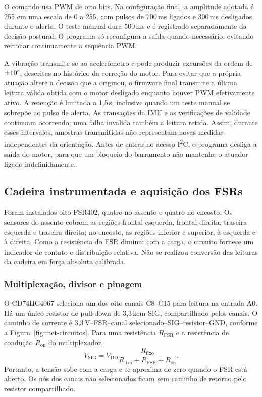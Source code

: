 O comando usa PWM de oito bits. Na configuração final, a amplitude
adotada é 255 em uma escala de 0 a 255, com pulsos de 700\,ms ligados
e 300\,ms desligados durante o alerta. O teste manual dura
500\,ms e é registrado separadamente da decisão postural. O programa
só reconfigura a saída quando necessário, evitando reiniciar
continuamente a sequência PWM.

A vibração transmite-se ao acelerômetro e pode produzir excursões da
ordem de $\pm10\degree{}$, descritas no histórico da correção do motor.
Para evitar que a própria atuação altere a decisão que a originou, o
firmware final transmite a última leitura válida obtida com o motor
desligado enquanto houver PWM efetivamente ativo. A retenção é limitada
a 1{,}5\,s, inclusive quando um teste manual se sobrepõe ao pulso de
alerta. As transações da IMU e as verificações de validade continuam
ocorrendo; uma falha invalida também a leitura retida. Assim, durante
esses intervalos, amostras transmitidas não representam novas medidas
independentes da orientação. Antes de entrar no acesso I\textsuperscript{2}C,
o programa desliga a saída do motor, para que um bloqueio do barramento
não mantenha o atuador ligado indefinidamente.

\subsection{Cadeira instrumentada e aquisição dos FSRs}
\label{sec:met-cadeira}

Foram instalados oito FSR402, quatro no assento e quatro no encosto. Os
sensores do assento cobrem as regiões frontal esquerda, frontal direita,
traseira esquerda e traseira direita; no encosto, as regiões inferior e
superior, à esquerda e à direita. Como a resistência do FSR diminui com a
carga, o circuito fornece um indicador de contato e distribuição
relativa. Não se realizou conversão das leituras da cadeira em força
absoluta calibrada.

\subsubsection{Multiplexação, divisor e pinagem}

O CD74HC4067 seleciona um dos oito canais C8--C15 para leitura na entrada
A0. Há um único resistor de pull-down de 3{,}3\,k\ohm em SIG,
compartilhado pelos canais. O caminho de corrente é
3{,}3\,V--FSR--canal selecionado--SIG--resistor--GND, conforme a
Figura~\ref{fig:met-circuitos}. Para uma resistência $R_{\mathrm{FSR}}$
e a resistência de condução $R_{\mathrm{on}}$ do multiplexador,
\begin{equation}
 V_{\mathrm{SIG}}=V_{\mathrm{DD}}
 \frac{R_{\mathrm{fixo}}}
 {R_{\mathrm{fixo}}+R_{\mathrm{FSR}}+R_{\mathrm{on}}}.
 \label{eq:met-divisor}
\end{equation}
Portanto, a tensão sobe com a carga e se aproxima de zero quando o FSR
está aberto. Os nós dos canais não selecionados ficam sem caminho de
retorno pelo resistor compartilhado.

